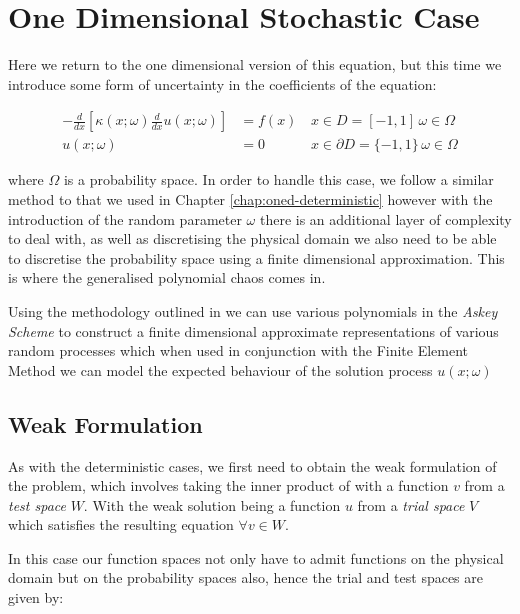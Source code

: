 \chapter{One Dimensional Stochastic Case}\label{chap:oned-stochastic}

Here we return to the one dimensional version of this equation, but this time
we introduce some form of uncertainty in the coefficients of the equation:

\begin{equation}\label{eq:oned-stochastic}
  \begin{aligned}
      -\frac{d}{dx}\left[\kappa(x;\omega)\frac{d}{dx}u(x;\omega)\right] &= f(x)\,
                              &x \in  D = [-1,1]\, \omega \in \Omega \\
    u(x;\omega) &= 0 &x \in \partial D = \{-1,1\}\, \omega \in \Omega
  \end{aligned}
\end{equation}

where $\Omega$ is a probability space. In order to handle this case, we follow
a similar method to that we used in Chapter \ref{chap:oned-deterministic}
however with the introduction of the random parameter $\omega$ there is an
additional layer of complexity to deal with, as well as discretising the
physical domain we also need to be able to discretise the probability space
using a finite dimensional approximation.  This is where the generalised
polynomial chaos comes in.

Using the methodology outlined in \cite{general-poly-chaos} we can use various
polynomials in the \textit{Askey Scheme} to construct a finite dimensional
approximate representations of various random processes which when used in
conjunction with the Finite Element Method we can model the expected behaviour
of the solution process $u(x;\omega)$

\section{Weak Formulation}

As with the deterministic cases, we first need to obtain the weak formulation
of the problem, which involves taking the inner product of
 with a function $v$ from a \textit{test space} $W$.
With the weak solution being a function $u$ from a \textit{trial space} $V$
which satisfies the resulting equation $\forall v \in W$.

In this case our function spaces not only have to admit functions on the
physical domain but on the probability spaces also, hence the trial and test
spaces are given by:

